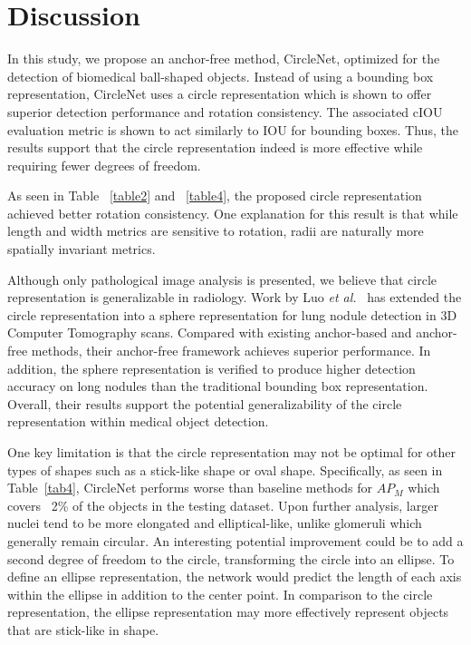 \documentclass[journal]{IEEEtran}
\newcommand{\Tab}{Table}
\newcommand{\etal}{\textit{et al.}}
\begin{document}
\section{Discussion}
In this study, we propose an anchor-free method, CircleNet, optimized for the detection of biomedical ball-shaped objects. Instead of using a bounding box representation, CircleNet uses a circle representation which is shown to offer superior detection performance and rotation consistency. The associated cIOU evaluation metric is shown to act similarly to IOU for bounding boxes. Thus, the results support that the circle representation indeed is more effective while requiring fewer degrees of freedom.

As seen in Table ~\ref{table2} and ~\ref{table4}, the proposed circle representation achieved better rotation consistency. One explanation for this result is that while length and width metrics are sensitive to rotation, radii are naturally more spatially invariant metrics.

Although only pathological image analysis is presented, we believe that circle representation is generalizable in radiology. Work by Luo \etal~\cite{luo2021scpmnet} has extended the circle representation into a sphere representation for lung nodule detection in 3D Computer Tomography scans. Compared with existing anchor-based and anchor-free methods, their anchor-free framework achieves superior performance. In addition, the sphere representation is verified to produce higher detection accuracy on long nodules than the traditional bounding box representation. Overall, their results support the potential generalizability of the circle representation within medical object detection.

One key limitation is that the circle representation may not be optimal for other types of shapes such as a stick-like shape or oval shape. Specifically, as seen in \Tab~\ref{tab4}, CircleNet performs worse than baseline methods for $AP_M$ which covers ~2\% of the objects in the testing dataset. Upon further analysis, larger nuclei tend to be more elongated and elliptical-like, unlike glomeruli which generally remain circular. An interesting potential improvement could be to add a second degree of freedom to the circle, transforming the circle into an ellipse. To define an ellipse representation, the network would predict the length of each axis within the ellipse in addition to the center point. In comparison to the circle representation, the ellipse representation may more effectively represent objects that are stick-like in shape.
\end{document}

